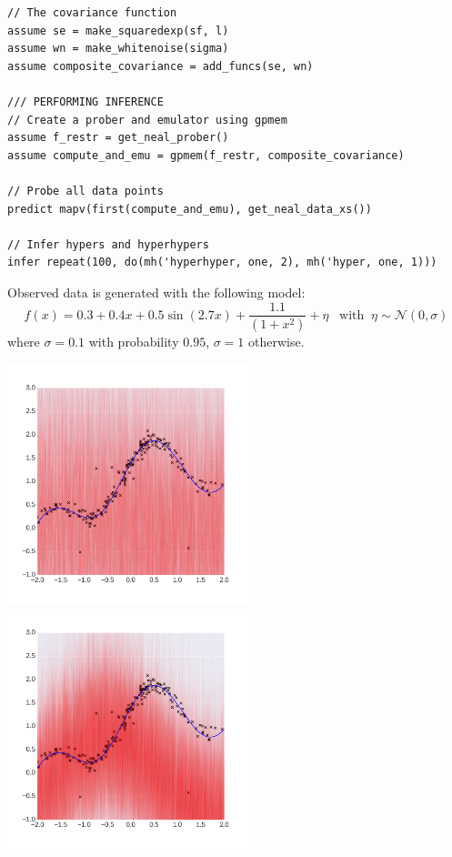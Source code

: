 \documentclass[a0,portrait]{a0poster}
\begin{document}
\begin{multicols}{3}
\begin{minipage}{\linewidth}
\begin{lstlisting}[frame=single,caption=Hierarchical  GP Smoothing,mathescape,label=alg:gphierarch]
// The covariance function
assume se = make_squaredexp(sf, l)
assume wn = make_whitenoise(sigma)
assume composite_covariance = add_funcs(se, wn)

/// PERFORMING INFERENCE
// Create a prober and emulator using gpmem
assume f_restr = get_neal_prober()
assume compute_and_emu = gpmem(f_restr, composite_covariance)

// Probe all data points
predict mapv(first(compute_and_emu), get_neal_data_xs())

// Infer hypers and hyperhypers
infer repeat(100, do(mh('hyperhyper, one, 2), mh('hyper, one, 1)))

\end{lstlisting}
\end{minipage}
Observed data is generated with the following model: 
\begin{equation*}
f(x) =  0.3 + 0.4 x + 0.5 \sin(2.7x) + \frac{1.1}{(1+ x^2)} + \eta \;\;\; \text{with}\;\;\eta \sim \mathcal{N}(0,\sigma)
\end{equation*} where $\sigma = 0.1$ with probability $0.95$, $\sigma = 1$ otherwise.
\begin{center}
\includegraphics[width=7cm]{neal_se_1final.png}
\includegraphics[width=7cm]{neal_se_2final.png}

\end{center}
\end{multicols}
\end{document}
